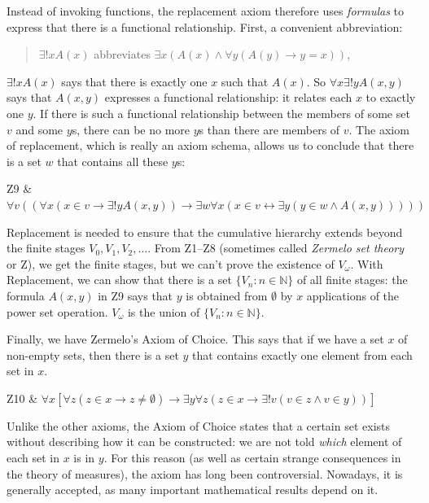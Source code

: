 Instead of invoking functions,
the replacement axiom therefore uses \emph{formulas} to express that
there is a functional relationship.
First, a convenient abbreviation:
\begin{quote}
   $\exists! x A(x)$ abbreviates $\exists x (A(x) \land \forall y ({A(y) \to y\!=\!x}))$,
\end{quote}
$\exists!x A(x)$ says that there is exactly one $x$ such that $A(x)$.
So $\forall x\exists! y A(x,y)$ says that
$A(x,y)$ expresses a functional relationship:
it relates each $x$ to exactly one $y$.
If there is such a functional relationship between
the members of some set $v$ and some $y$s,
there can be no more $y$s than there are members of $v$.
The axiom of replacement, which is really an axiom schema, allows us to conclude that
there is a set $w$ that contains all these $y$s:
\begin{axioms}
    Z9 & $\forall v((\forall x(x \in v \to \exists!y A(x,y)) \to \exists w\forall x(x \in v \leftrightarrow \exists y(y \in w \land A(x,y)))))$
\end{axioms}

Replacement is needed to ensure that
the cumulative hierarchy extends beyond the finite stages $V_0, V_1, V_2, \ldots$.
From Z1--Z8 (sometimes called \emph{Zermelo set theory} or Z),
we get the finite stages,
but we can't prove the existence of $V_{\omega}$.
With Replacement,
we can show that there is a set $\{ V_{n} : n \in \mathbb{N} \}$ of all finite stages:
the formula $A(x,y)$ in Z9 says that
$y$ is obtained from $\emptyset$ by $x$ applications of the power set operation.
$V_{\omega}$ is the union of $\{ V_{n} : n \in \mathbb{N} \}$.

Finally,
we have Zermelo's Axiom of Choice.
This says that if we have a set $x$ of non-empty sets,
then there is a set $y$ that contains exactly one element from each set in $x$.

\begin{axioms}
    Z10 & $\forall x[\forall z(z \in x \to z\neq\emptyset) \to \exists y \forall z(z \in x \to \exists! v(v \in z \land v \in y))]$ \\
\end{axioms}

Unlike the other axioms,
the Axiom of Choice states that a certain set exists
without describing how it can be constructed:
we are not told \emph{which} element of each set in $x$ is in $y$.
For this reason (as well as certain strange consequences in the theory of measures),
the axiom has long been controversial.
Nowadays,
it is generally accepted,
as many important mathematical results depend on it.

